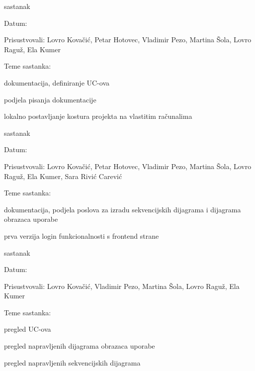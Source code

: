 \begin{packed_enum}
			\item  sastanak
			\item[] \begin{packed_item}
				\item Datum: 
				\item Prisustvovali: Lovro Kovačić, Petar Hotovec, Vladimir Pezo, Martina Šola, Lovro Raguž, Ela Kumer
				\item Teme sastanka:
				\begin{packed_item}
					\item  dokumentacija, definiranje UC-ova
					\item  podjela pisanja dokumentacije
					\item  lokalno postavljanje kostura projekta na vlastitim računalima
				\end{packed_item}
			\end{packed_item}
			
			\item  sastanak
			\item[] \begin{packed_item}
				\item Datum: \DTMdisplaydate{2022}{11}{2}{-1}
				\item Prisustvovali: Lovro Kovačić, Petar Hotovec, Vladimir Pezo, Martina Šola, Lovro Raguž, Ela Kumer, Sara Rivić Carević
				\item Teme sastanka:
				\begin{packed_item}
					\item  dokumentacija, podjela poslova za izradu sekvencijskih dijagrama i dijagrama obrazaca uporabe
					\item  prva verzija login funkcionalnosti s frontend strane
				\end{packed_item}
			\end{packed_item}
			
			\item  sastanak
			\item[] \begin{packed_item}
				\item Datum: \DTMdisplaydate{2022}{11}{3}{-1}
				\item Prisustvovali: Lovro Kovačić, Vladimir Pezo, Martina Šola, Lovro Raguž, Ela Kumer
				\item Teme sastanka:
				\begin{packed_item}
				    \item  pregled UC-ova
					\item  pregled napravljenih dijagrama obrazaca uporabe
					\item  pregled napravljenih sekvencijskih dijagrama
				\end{packed_item}
			\end{packed_item}
			
			
		\end{packed_enum}
		
